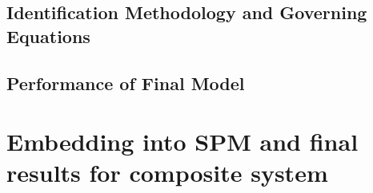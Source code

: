 
\subsection{Identification Methodology and Governing Equations}\label{subsubsec:actualsysid}
\subsection{Performance of Final Model}
\section{Embedding into SPM and final results for composite system}


